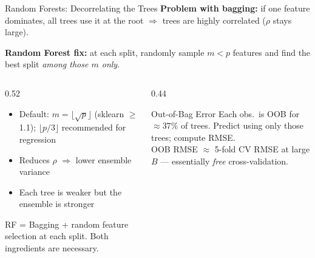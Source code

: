 \documentclass[aspectratio=169, 10pt]{beamer}
\begin{document}
\begin{frame}{Random Forests: Decorrelating the Trees}
  \textbf{Problem with bagging:} if one feature dominates, all trees use it
  at the root $\Rightarrow$ trees are highly correlated ($\rho$ stays large).

  \smallskip
  \textbf{Random Forest fix:} at each split, randomly sample $m < p$ features
  and find the best split \emph{among those $m$ only}.

  \begin{columns}[T]
    \begin{column}{0.52\textwidth}
      \begin{itemize}
        \item Default: $m = \lfloor\sqrt{p}\rfloor$ (sklearn $\geq$ 1.1);
              $\lfloor p/3 \rfloor$ recommended for regression \parencite[§15.3]{Hastie2009}
        \item Reduces $\rho$ $\Rightarrow$ lower ensemble variance
        \item Each tree is weaker but the ensemble is stronger
      \end{itemize}

      \smallskip
      \begin{keybox}
        RF = Bagging + random feature selection at each split.
        Both ingredients are necessary.
      \end{keybox}
    \end{column}
    \begin{column}{0.44\textwidth}
      \begin{examplebox}{Out-of-Bag Error}
        Each obs.\ is OOB for $\approx 37\%$ of trees.
        Predict using only those trees; compute RMSE.\\[2pt]
        OOB RMSE $\approx$ 5-fold CV RMSE at large $B$
        — essentially \emph{free} cross-validation.
      \end{examplebox}
    \end{column}
  \end{columns}
\end{frame}
\end{document}
